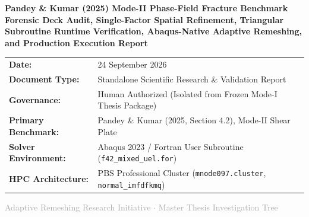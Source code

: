 \documentclass[11pt,a4paper]{article}
\newcommand{\statusbadge}[2]{%
  \colorbox{#1}{\textcolor{white}{\textbf{\footnotesize\strut #2}}}%
}
\begin{document}
\begin{titlepage}
    \centering
    \vspace*{0.8cm}
    
    {\Huge\bfseries\color{primaryblue} Pandey \& Kumar (2025) Mode-II Phase-Field Fracture Benchmark}\\[0.4cm]
    {\Large\bfseries Forensic Deck Audit, Single-Factor Spatial Refinement, Triangular Subroutine Runtime Verification, Abaqus-Native Adaptive Remeshing, and Production Execution Report}\\[1.2cm]
    
    
    \vspace{1.2cm}
    
    \begin{tabular}{ll}
        \textbf{Date:} & 24 September 2026 \\
        \textbf{Document Type:} & Standalone Scientific Research \& Validation Report \\
        \textbf{Governance:} & Human Authorized (Isolated from Frozen Mode-I Thesis Package) \\
        \textbf{Primary Benchmark:} & Pandey \& Kumar (2025, Section 4.2), Mode-II Shear Plate \\
        \textbf{Solver Environment:} & Abaqus 2023 / Fortran User Subroutine (\texttt{f42\_mixed\_uel.for}) \\
        \textbf{HPC Architecture:} & PBS Professional Cluster (\texttt{mnode097.cluster}, \texttt{normal\_imfdfkmq}) \\
    \end{tabular}
    
    \vfill
    
    {\small\textcolor{darkgray}{Adaptive Remeshing Research Initiative $\cdot$ Master Thesis Investigation Tree}}
    \vspace*{0.5cm}
\end{titlepage}
\end{document}
